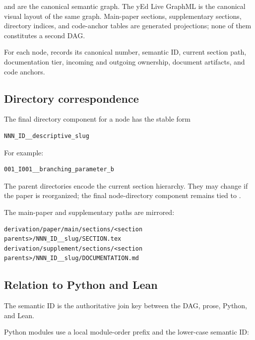 \texttt{\protect{}} and
\texttt{\protect{}} are the canonical semantic
graph. The yEd Live GraphML is the canonical visual layout of the same
graph. Main-paper sections, supplementary sections, directory indices,
and code-anchor tables are generated projections; none of them
constitutes a second DAG.

For each node,
\texttt{\protect{}}
records its canonical number, semantic ID, current section path,
documentation tier, incoming and outgoing ownership, document artifacts,
and code anchors.

\subsection{Directory correspondence}\label{directory-correspondence}

The final directory component for a node has the stable form

\begin{verbatim}
NNN_ID__descriptive_slug
\end{verbatim}

For example:

\begin{verbatim}
001_I001__branching_parameter_b
\end{verbatim}

The parent directories encode the current section hierarchy. They may
change if the paper is reorganized; the final node-directory component
remains tied to \texttt{\protect{}}.

The main-paper and supplementary paths are mirrored:

\begin{verbatim}
derivation/paper/main/sections/<section parents>/NNN_ID__slug/SECTION.tex
derivation/supplement/sections/<section parents>/NNN_ID__slug/DOCUMENTATION.md
\end{verbatim}

\subsection{Relation to Python and
Lean}\label{relation-to-python-and-lean}

The semantic ID is the authoritative join key between the DAG, prose,
Python, and Lean.

Python modules use a local module-order prefix and the lower-case
semantic ID:

